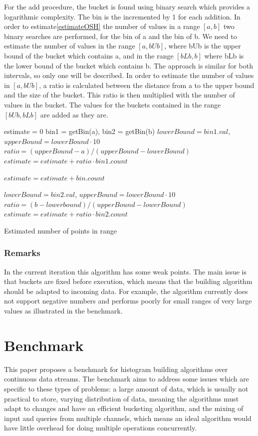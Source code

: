 \documentclass[12pt]{article}
\begin{document}
	For the add procedure, the bucket is found using binary search which 
	provides a logarithmic complexity. The bin is the incremented by 1 
	for each addition. In order to estimate\ref{estimateOSH} the number of values in a range $ [a, b] $ 
	two binary searches are performed, for the bin of a and the bin of b. We 
	need to estimate the number of values in the range $[a, bUb]$, where bUb is the upper
	bound of the bucket which contains a, and in the range $[bLb, b]$ where bLb is the
	lower bound of the bucket which contains b. The approach is similar for both 
	intervals, so only one will be described. In order to estimate the number 
	of values in $[a, bUb]$, a ratio is calculated between the distance from 
	a to the upper bound and the size of the bucket. This ratio is then multiplied 
	with the number of values in the bucket. The values for the buckets contained 
	in the range $ [bUb, bLb] $ are added as they are.
	
	\begin{algorithm}[H]
		\label{estimateOSH}

		estimate = 0\;
		bin1 = getBin(a), bin2 = getBin(b)\;
		$lowerBound = bin1.val$, $upperBound = lowerBound \cdot 10$\;
		$ratio = (upperBound - a) / (upperBound - lowerBound)$\;
		$estimate = estimate + ratio \cdot bin1.count$\;

		 {
			$estimate = estimate + bin.count$
		}

		$lowerBound = bin2.val$, $upperBound = lowerBound \cdot 10$\;
		$ratio = (b - lowerbound) / (upperBound - lowerBound)$\;
		$estimate = estimate + ratio \cdot bin2.count$\;

		\caption{Estimated number of points in range}
	\end{algorithm}

	\subsubsection{Remarks}
	In the current iteration this algorithm has some weak points. The main 
	issue is that buckets are fixed before execution, which means that 
	the building algorithm should be adapted to incoming data. For example, 
	the algorithm currently does not support negative numbers and performs 
	poorly for small ranges of very large values as illustrated in the benchmark.
	
	\section{Benchmark}
	This paper proposes a benchmark for histogram building algorithms 
	over continuous data streams. The benchmark aims to address some 
	issues which are specific to these types of problems: a large amount 
	of data, which is usually not practical to store, varying distribution 
	of data, meaning the algorithms must adapt to changes and have an 
	efficient bucketing algorithm, and the mixing of input and queries from 
	multiple channels, which means an ideal algorithm would have little overhead 
	for doing multiple operations concurrently.
\end{document}
